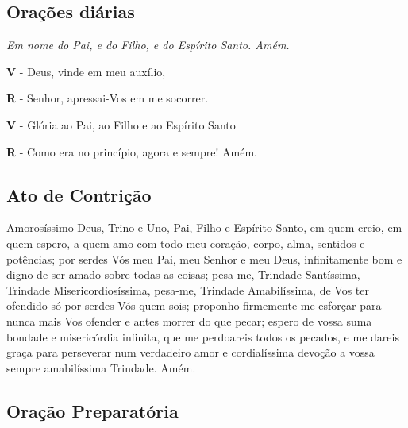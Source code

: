 \documentclass[18pt]{article}
\begin{document}

\newpage

\begin{justify}
\begin{center}
\section{Orações diárias}\label{sec:Orações}
\textit{Em nome do Pai, e do Filho, e do Espírito Santo. Amém.}

\textbf{V} - Deus, vinde em meu auxílio,

\textbf{R} - Senhor, apressai-Vos em me socorrer.

\textbf{V} - Glória ao Pai, ao Filho e ao Espírito Santo

\textbf{R} - Como era no princípio, agora e sempre! Amém.

\end{center}


\subsection{Ato de Contrição} \label{sec:AtoDeContrição}

Amorosíssimo Deus, Trino e Uno, Pai, Filho e Espírito Santo, em quem creio, em quem espero, a quem amo com todo meu coração, corpo, alma, sentidos e potências; por serdes Vós meu Pai, meu Senhor e meu Deus, infinitamente bom e digno de ser amado sobre todas as coisas; pesa-me, Trindade Santíssima, Trindade Misericordiosíssima, pesa-me, Trindade Amabilíssima, de Vos ter ofendido só por serdes Vós quem sois; proponho firmemente me esforçar para nunca mais Vos ofender e antes morrer do que pecar; espero de vossa suma bondade e misericórdia infinita, que me perdoareis todos os pecados, e me dareis graça para perseverar num verdadeiro amor e cordialíssima devoção a vossa sempre amabilíssima Trindade. Amém.

\subsection{Oração Preparatória} \label{sec:OraçãoPreparatória}


\end{justify}
\end{document}

